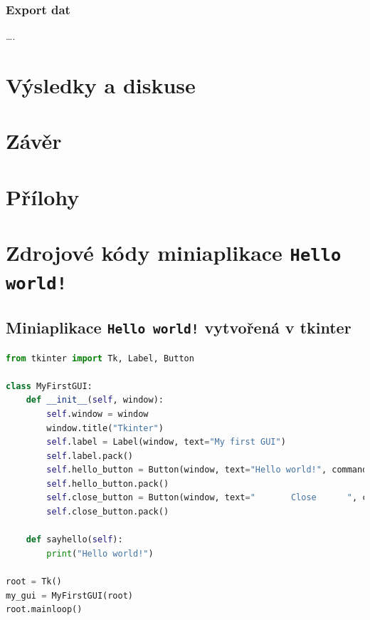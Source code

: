 \documentclass[a4paper, 12pt]{article}
\begin{document}
\subsubsection{Export dat} \label{sec:export}
\ldots .

\newpage
\section{Výsledky a diskuse} \label{sec:diskuze}

\newpage
\section{Závěr}


\newpage



\listoffigures

\newpage
\section*{Přílohy}
\appendix
\section{Zdrojové kódy miniaplikace \texttt{Hello world!}}
\label{PrilohaA}
\subsection{Miniaplikace \texttt{Hello world!} vytvořená v tkinter}
\begin{lstlisting}[language=Python]
from tkinter import Tk, Label, Button

class MyFirstGUI:
    def __init__(self, window):
        self.window = window
        window.title("Tkinter")
        self.label = Label(window, text="My first GUI")
        self.label.pack()
        self.hello_button = Button(window, text="Hello world!", command=self.sayhello)
        self.hello_button.pack()
        self.close_button = Button(window, text="       Close      ", command=window.quit)
        self.close_button.pack()

    def sayhello(self):
        print("Hello world!")

root = Tk()
my_gui = MyFirstGUI(root)
root.mainloop()
\end{lstlisting}
\end{document}
